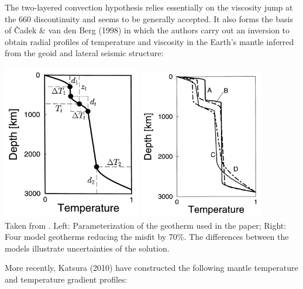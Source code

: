 The two-layered convection hypothesis relies essentially 
on the viscosity jump at the 660 discontinuity and seems 
to be generally accepted.
It also forms the basis of {\v{C}}adek \& van den Berg (1998) \cite{cava98}
in which the authors carry out an inversion to obtain 
radial profiles of temperature and viscosity in the Earth's mantle
inferred from the geoid and lateral seismic structure:
\begin{center}
\includegraphics[width=6cm]{images/adiabatic/cava98a.png}
\includegraphics[width=5.5cm]{images/adiabatic/cava98b.png}\\
{\captionfont Taken from \cite{cava98}. 
Left: Parameterization of the geotherm used in the paper;
Right: Four model geotherms reducing the misfit by 70\%. The
differences between the models illustrate uncertainties of the
solution.}
\end{center}

More recently, Katsura \etal (2010) \cite{kayy10} have constructed the following mantle temperature 
and temperature gradient profiles:

